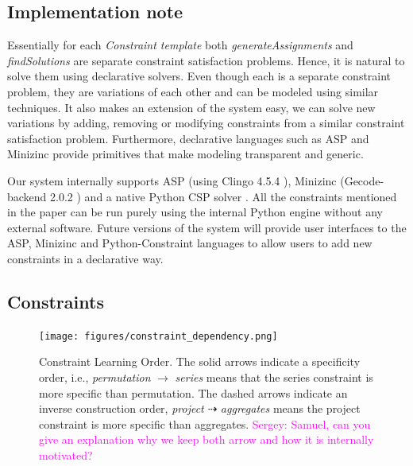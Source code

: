 \documentclass{ecai}
\newcommand{\sergey}[1]{\textcolor{magenta}{{\sc Sergey:} #1}\xspace}
\newcommand{\format}[1]{\textit{#1}\xspace}
\newcommand{\generategroups}{\format{generateAssignments}}
\newcommand{\findassignment}{\format{findSolutions}}
\newcommand{\template}{\format{Constraint template}}
\begin{document}
\subsection{Implementation note} Essentially for each \template both \generategroups and \findassignment are separate constraint satisfaction problems. Hence, it is natural to solve them using declarative solvers. Even though each is a separate constraint problem, they are variations of each other and can be modeled using similar techniques. It also makes an extension of the system easy, we can solve new variations by adding, removing or modifying constraints from a similar constraint satisfaction problem. Furthermore, declarative languages such as ASP \cite{whaisasp} and Minizinc \cite{minizinc} provide primitives that make modeling transparent and generic.

Our system internally supports ASP (using Clingo 4.5.4 \cite{clingo}), Minizinc (Gecode-backend 2.0.2 \cite{minizinc}) and a native Python CSP solver \cite{python_constraint}. All the constraints mentioned in the paper can be run purely using the internal Python engine without any external software. Future versions of the system will provide user interfaces to the ASP, Minizinc and Python-Constraint languages to allow users to add new constraints in a declarative way.

\subsection{Constraints}

\begin{figure}[htb]
  \centering
  \texttt{[image: figures/constraint\_dependency.png]}
  \caption{Constraint Learning Order. The solid arrows indicate a specificity order, i.e., \textit{permutation} $\rightarrow$ \textit{series} means that the series constraint is more specific than permutation. The dashed arrows indicate an inverse construction order, \textit{project} $\dashrightarrow$ \textit{aggregates} means the project constraint is more specific than aggregates. \sergey{Samuel,  can you give an explanation why we keep both arrow and how it is internally motivated?}}
  \label{fig:learning_order}
\end{figure}


\newcommand{\numeric}{\format{numeric}}
\newcommand{\textual}{\format{textual}}
\newcommand{\integer}{\format{integer}}
\newcommand{\plength}{\format{length}}
\newcommand{\ptype}{\format{type}}
\newcommand{\ptable}{\format{table}}
\newcommand{\por}{\format{orientation}}
\newcommand{\nat}{\mathcal{N}}
\end{document}

